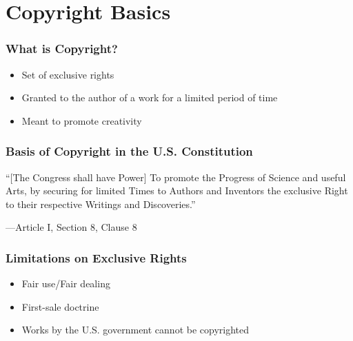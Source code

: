 \section{Copyright Basics}

\begin{frame}
  \frametitle{What is Copyright?}

  \begin{itemize}
    \item Set of exclusive rights
    \item Granted to the author of a work for a limited period of time
    \item Meant to promote creativity
  \end{itemize}
\end{frame}

\begin{frame}
  \frametitle{Basis of Copyright in the U.S. Constitution}

  ``[The Congress shall have Power] To promote the Progress of Science and useful
  Arts, by securing for limited Times to Authors and Inventors the exclusive
  Right to their respective Writings and Discoveries.''

  \begin{flushright}
    ---Article I, Section 8, Clause 8
  \end{flushright}
\end{frame}

\begin{frame}
  \frametitle{Limitations on Exclusive Rights}

  \begin{itemize}
    \item Fair use/Fair dealing
    \item First-sale doctrine
    \item Works by the U.S. government cannot be copyrighted
  \end{itemize}
\end{frame}
